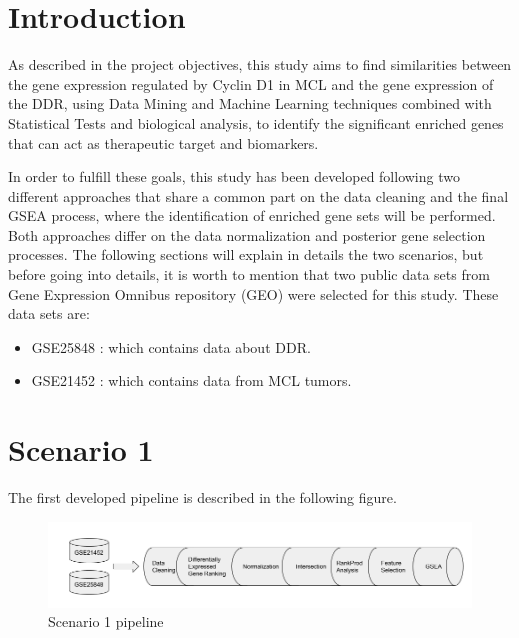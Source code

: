 \onehalfspacing

\section{Introduction}
As described in the project objectives, this study aims to find similarities between the gene expression regulated by Cyclin D1 in MCL and the gene expression of the DDR, using Data Mining and Machine Learning techniques combined with Statistical Tests and biological analysis, to identify the significant enriched genes that can act as therapeutic target and biomarkers.

In order to fulfill these goals, this study has been developed following two different approaches that share a common part on the data cleaning and the final GSEA process, where the identification of enriched gene sets will be performed.
Both approaches differ on the data normalization and posterior gene selection processes. The following sections will explain in details the two scenarios, but before going into details, it is worth to mention that two public data sets from Gene Expression Omnibus repository (GEO) were selected for this study. These data sets are:

\begin{itemize}
    \item GSE25848 \cite{ddrData:2011}: which contains data about DDR.
    \item GSE21452 \cite{mclData:2011}: which contains data from MCL tumors.
\end{itemize}

\newpage
\section{Scenario 1}

The first developed pipeline is described in the following figure.

\begin{figure}[h]
    \centering
    \includegraphics[scale=0.5]{../figs/scenario_1_figure.png}
    \caption{Scenario 1 pipeline}
    \label{fig:scenario-1}
\end{figure}

